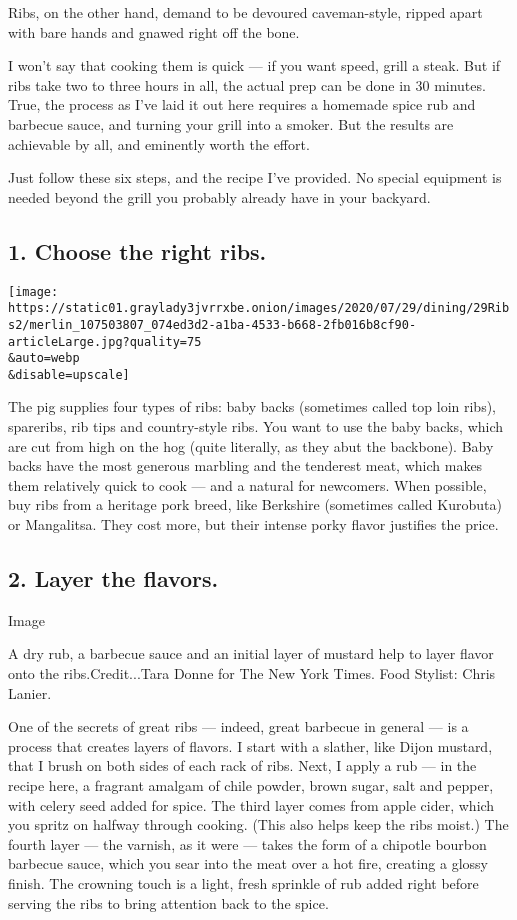 Ribs, on the other hand, demand to be devoured caveman-style, ripped
apart with bare hands and gnawed right off the bone.

I won't say that cooking them is quick --- if you want speed, grill a
steak. But if ribs take two to three hours in all, the actual prep can
be done in 30 minutes. True, the process as I've laid it out here
requires a homemade spice rub and barbecue sauce, and turning your grill
into a smoker. But the results are achievable by all, and eminently
worth the effort.

Just follow these six steps, and the recipe I've provided. No special
equipment is needed beyond the grill you probably already have in your
backyard.

\hypertarget{1-choose-the-right-ribs}{%
\subsection{1. Choose the right ribs.}\label{1-choose-the-right-ribs}}

\texttt{[image: https://static01.graylady3jvrrxbe.onion/images/2020/07/29/dining/29Ribs2/merlin\_107503807\_074ed3d2-a1ba-4533-b668-2fb016b8cf90-articleLarge.jpg?quality=75\\\&auto=webp\\\&disable=upscale]}

The pig supplies four types of ribs: baby backs (sometimes called top
loin ribs), spareribs, rib tips and country-style ribs. You want to use
the baby backs, which are cut from high on the hog (quite literally, as
they abut the backbone). Baby backs have the most generous marbling and
the tenderest meat, which makes them relatively quick to cook --- and a
natural for newcomers. When possible, buy ribs from a heritage pork
breed, like Berkshire (sometimes called Kurobuta) or Mangalitsa. They
cost more, but their intense porky flavor justifies the price.

\hypertarget{2-layer-the-flavors}{%
\subsection{2. Layer the flavors.}\label{2-layer-the-flavors}}

Image

A dry rub, a barbecue sauce and an initial layer of mustard help to
layer flavor onto the ribs.Credit...Tara Donne for The New York Times.
Food Stylist: Chris Lanier.

One of the secrets of great ribs --- indeed, great barbecue in general
--- is a process that creates layers of flavors. I start with a slather,
like Dijon mustard, that I brush on both sides of each rack of ribs.
Next, I apply a rub --- in the recipe here, a fragrant amalgam of chile
powder, brown sugar, salt and pepper, with celery seed added for spice.
The third layer comes from apple cider, which you spritz on halfway
through cooking. (This also helps keep the ribs moist.) The fourth layer
--- the varnish, as it were --- takes the form of a chipotle bourbon
barbecue sauce, which you sear into the meat over a hot fire, creating a
glossy finish. The crowning touch is a light, fresh sprinkle of rub
added right before serving the ribs to bring attention back to the
spice.

